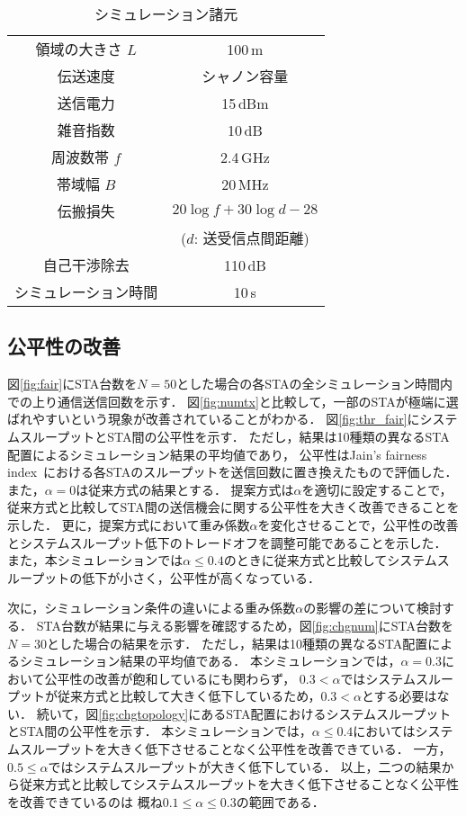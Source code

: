\documentclass[twocolumn, a4paper]{ieicejsp}
\begin{document}
	\begin{table}[t]
		\centering
		\caption{シミュレーション諸元}
		\label{tab:param}
		\begin{tabular}{cc} \hline
			領域の大きさ $L$ & 100\,m \\
			伝送速度 & シャノン容量 \\
			送信電力 & 15\,dBm \\
			雑音指数 & 10\,dB \\
			周波数帯 $f$& 2.4\,GHz \\
			帯域幅 $B$ & 20\,MHz \\
			伝搬損失 & $20\log f+30\log d - 28$\\
			&($d$: 送受信点間距離)\\
			自己干渉除去 & 110\,dB \\
			シミュレーション時間 & 10\,s \\\hline
		\end{tabular}
	\end{table}

	\subsection{公平性の改善}
		図\ref{fig:fair}にSTA台数を$N=50$とした場合の各STAの全シミュレーション時間内での上り通信送信回数を示す．
		図\ref{fig:numtx}と比較して，一部のSTAが極端に選ばれやすいという現象が改善されていることがわかる．
		図\ref{fig:thr_fair}にシステムスループットとSTA間の公平性を示す．
		ただし，結果は10種類の異なるSTA配置によるシミュレーション結果の平均値であり，
		公平性はJain's fairness index~\cite{jain}における各STAのスループットを送信回数に置き換えたもので評価した．
		また，$\alpha=0$は従来方式の結果とする．
		提案方式は$\alpha$を適切に設定することで，従来方式と比較してSTA間の送信機会に関する公平性を大きく改善できることを示した．
		更に，提案方式において重み係数$\alpha$を変化させることで，公平性の改善とシステムスループット低下のトレードオフを調整可能であることを示した．
		また，本シミュレーションでは$\alpha\leq0.4$のときに従来方式と比較してシステムスループットの低下が小さく，公平性が高くなっている．
		\par
		次に，シミュレーション条件の違いによる重み係数$\alpha$の影響の差について検討する．
		STA台数が結果に与える影響を確認するため，図\ref{fig:chgnum}にSTA台数を$N=30$とした場合の結果を示す．
		ただし，結果は10種類の異なるSTA配置によるシミュレーション結果の平均値である．
		本シミュレーションでは，$\alpha=0.3$において公平性の改善が飽和しているにも関わらず，
		$0.3<\alpha$ではシステムスループットが従来方式と比較して大きく低下しているため，$0.3<\alpha$とする必要はない．
		続いて，図\ref{fig:chgtopology}にあるSTA配置におけるシステムスループットとSTA間の公平性を示す．
		本シミュレーションでは，$\alpha\leq0.4$においてはシステムスループットを大きく低下させることなく公平性を改善できている．
		一方，$0.5\leq\alpha$ではシステムスループットが大きく低下している．
		以上，二つの結果から従来方式と比較してシステムスループットを大きく低下させることなく公平性を改善できているのは
		概ね$0.1\leq\alpha\leq0.3$の範囲である．
\end{document}
